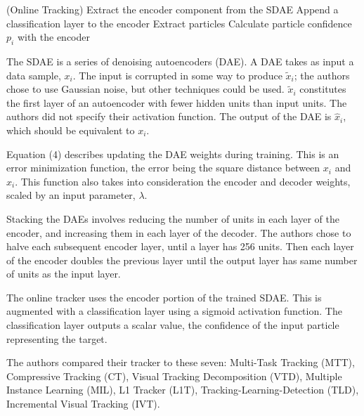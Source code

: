 \documentclass[11pt]{article}
\begin{document}
\begin{description}[leftmargin=0in]
        \begin{algorithm}
            \Begin(Online Tracking)
            {
                Extract the encoder component from the SDAE\;
                Append a classification layer to the encoder\;
                {
                    Extract particles\;
                    {
                        Calculate particle confidence $p_i$ with the encoder\;
                    }
                }
            }
        \end{algorithm}

        The SDAE is a series of denoising autoencoders (DAE). A DAE takes as
        input a data sample, $x_i$. The input is corrupted in some way to
        produce $\tilde{x}_i$; the authors chose to use Gaussian noise, but
        other techniques could be used. $\tilde{x}_i$ constitutes the first
        layer of an autoencoder with fewer hidden units than input units. The
        authors did not specify their activation function. The output of the DAE
        is $\hat{x}_i$, which should be equivalent to $x_i$.

        Equation (4) describes updating the DAE weights during training. This is
        an error minimization function, the error being the square distance
        between $x_i$ and $\hat{x}_i$. This function also takes into
        consideration the encoder and decoder weights, scaled by an input
        parameter, $\lambda$.
        
        Stacking the DAEs involves reducing the number of units in each layer of
        the encoder, and increasing them in each layer of the decoder. The
        authors chose to halve each subsequent encoder layer, until a layer has
        256 units. Then each layer of the encoder doubles the previous layer
        until the output layer has same number of units as the input layer.
        
        The online tracker uses the encoder portion of the trained SDAE. This is
        augmented with a classification layer using a sigmoid activation
        function. The classification layer outputs a scalar value, the
        confidence of the input particle representing the target.


    \item [Experiments] The authors compared their tracker to these seven:
        Multi-Task Tracking (MTT), Compressive Tracking (CT), Visual Tracking
        Decomposition (VTD), Multiple Instance Learning (MIL), L1 Tracker (L1T),
        Tracking-Learning-Detection (TLD), Incremental Visual Tracking (IVT).


\end{description}
\end{document}
